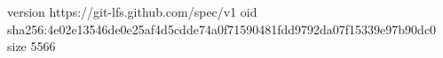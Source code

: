 version https://git-lfs.github.com/spec/v1
oid sha256:4e02e13546de0e25af4d5cdde74a0f71590481fdd9792da07f15339e97b90dc0
size 5566
